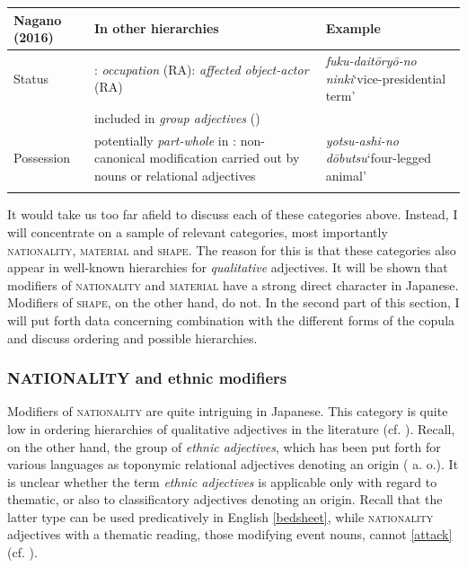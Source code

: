 \clearpage
\begin{table}[t]
\begin{tabularx}{\textwidth}{lQp{4cm}}
\midrule
\textbf{Nagano (2016)} & \textbf{In other hierarchies} & \textbf{Example} \\
\midrule
Status & \citet{downing:1977:creation}: \textit{occupation} (RA)\newline \citet{warren:1984:classifying}: \textit{affected object-actor} (RA)  & \textit{fuku-daitōryō-no ninki}\newline `vice-presidential term'\\
& included in \textit{group adjectives} (\citealt{grimshaw:1991:argument, cetnarowska:2015:categorial}) & \\
\tablevspace
Possession & potentially \textit{part-whole} in \citet{warren:1984:classifying}\newline \citet{nikolaeva:2012:possession, nikolaeva:2020:mixed, spencer:2017:denominal}: non-canonical modification carried out by nouns or relational adjectives & \textit{yotsu-ashi-no dōbutsu}\newline `four-legged animal'\\
\lspbottomrule
\end{tabularx}
\end{table}

It would take us too far afield to discuss each of these categories above. Instead, I will concentrate on a sample of relevant categories, most importantly \textsc{nationality}, \textsc{material} and \textsc{shape}. The reason for this is that these categories also appear in well-known hierarchies for \textit{qualitative} adjectives. It will be shown that modifiers of \textsc{nationality} and \textsc{material} have a strong direct character in Japanese. Modifiers of \textsc{shape}, on the other hand, do not. In the second part of this section, I will put forth data concerning combination with the different forms of the copula and discuss ordering and possible hierarchies.

\subsubsection{NATIONALITY and ethnic modifiers}

Modifiers of \textsc{nationality} are quite intriguing in Japanese. This category is quite low in ordering hierarchies of qualitative adjectives in the literature (cf. \citealt{scott:2002:stacked}). Recall, on the other hand, the group of \textit{ethnic adjectives}, which has been put forth for various languages as toponymic relational adjectives denoting an origin (\citealt{bartning:1984:aspects, bosque:1996:postnominal, gunkel:2008:constraints, alex:2011:ea} a. o.). It is unclear whether the term \textit{ethnic adjectives} is applicable only with regard to thematic, or also to classificatory adjectives denoting an origin. Recall that the latter type can be used predicatively in  English \ref{bedsheet}, while \textsc{nationality} adjectives with a thematic reading, those modifying event nouns, cannot \ref{attack} (cf. \citealt{alex:2011:ea}).

